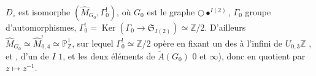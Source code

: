 \documentclass[11pt,a4paper]{article}
\begin{document}
$D_{\circ}$ est isomorphe   $(\widehat{M}_{G_0}, \Gamma^{!}_0)$, où $G_0$ est le graphe $\bigcirc\!\bullet^{I(2)}$, $\Gamma_0$  groupe d'automorphismes,  $\Gamma^{!}_0 = \operatorname{Ker}(\Gamma_0 \to \mathfrak{S}_{I(2)}) \simeq \mathbb{Z}/2$. D'ailleurs $\widehat{M}_{G_0} \simeq \widehat{M}^{!}_{0,4} \simeq \mathbb{P}^1_{\mathbb{Z}}$, sur lequel  $\Gamma^{!}_0 \simeq \mathbb{Z}/2$ opère en fixant un des  à l'infini  de $U_{0,3}\mathbb{Z}$ , et  \uncertain{\ill{}} ,   \ill{}  \ill{}  d'un  de $I$  $1$, et les deux éléments de $\widetilde{A}(G_0)$  $0$ et $\infty$), donc  en \og quotient\fg{} par $z \mapsto z^{-1}$. 
\end{document}
